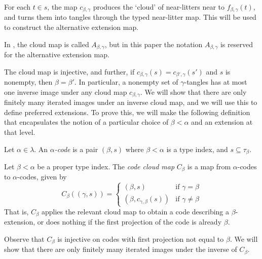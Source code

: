 For each \( t \in s \), the map \( c_{\beta,\gamma} \) produces the `cloud' of near-litters near to \( f_{\beta,\gamma}(t) \), and turns them into tangles through the typed near-litter map.
This will be used to construct the alternative extension map.

\begin{note}
    In \cite{holmes2023nf}, the cloud map is called \( A_{\beta,\gamma} \), but in this paper the notation \( A_{\beta,\gamma} \) is reserved for the alternative extension map.
\end{note}

\begin{remark}
    The cloud map is injective, and further, if \( c_{\beta,\gamma}(s) = c_{\beta',\gamma}(s') \) and \( s \) is nonempty, then \( \beta = \beta' \).
    In particular, a nonempty set of \( \gamma \)-tangles has at most one inverse image under any cloud map \( c_{\beta,\gamma} \).
    We will show that there are only finitely many iterated images under an inverse cloud map, and we will use this to define preferred extensions.
    To prove this, we will make the following definition that encapsulates the notion of a particular choice of \( \beta < \alpha \) and an extension at that level.
\end{remark}

\begin{definition}
    Let \( \alpha \in \lambda \).
    An \emph{\( \alpha \)-code} is a pair \( (\beta, s) \) where \( \beta < \alpha \) is a type index, and \( s \subseteq \tau_\beta \).
\end{definition}

\begin{definition}
    Let \( \beta < \alpha \) be a proper type index.
    The \emph{code cloud map} \( C_\beta \) is a map from \( \alpha \)-codes to \( \alpha \)-codes, given by
    \[ C_\beta((\gamma, s)) = \begin{cases}
        (\beta, s) & \text{if } \gamma = \beta \\
        (\beta, c_{\gamma,\beta}(s)) & \text{if } \gamma \neq \beta
    \end{cases} \]
    That is, \( C_\beta \) applies the relevant cloud map to obtain a code describing a \( \beta \)-extension, or does nothing if the first projection of the code is already \( \beta \).
\end{definition}

Observe that \( C_\beta \) is injective on codes with first projection not equal to \( \beta \).
We will show that there are only finitely many iterated images under the inverse of \( C_\beta \).

